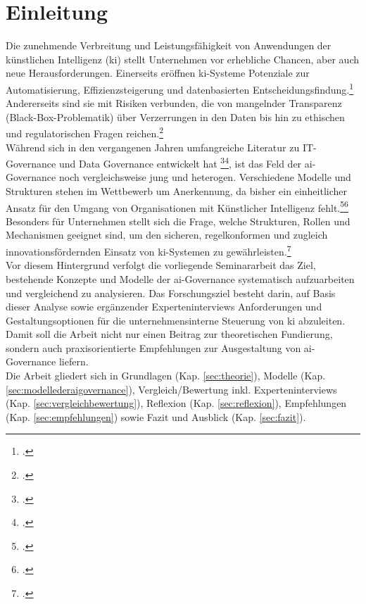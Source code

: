 \section{Einleitung}
\label{sec:einleitung}
Die zunehmende Verbreitung und Leistungsfähigkeit von Anwendungen der künstlichen Intelligenz (\acs{ki}) stellt Unternehmen vor erhebliche Chancen, aber auch neue Herausforderungen.
Einerseits eröffnen \ac{ki}-Systeme Potenziale zur Automatisierung, Effizienzsteigerung und datenbasierten Entscheidungsfindung.\footcite[4,7]{raiNextGenerationDigitalPlatforms2019}
Andererseits sind sie mit Risiken verbunden, die von mangelnder Transparenz (\glqq{}Black-Box\grqq{}-Problematik) über Verzerrungen in den Daten bis hin zu ethischen und regulatorischen Fragen reichen.\footcite[13,14-17]{europeancomissionEthicsGuidelinesTrustworthy}
\\
Während sich in den vergangenen Jahren umfangreiche Literatur zu IT-Governance und Data Governance entwickelt hat \footcite[8-10]{weillITGovernanceHow2004}\footcite[148]{khatriDesigningDataGovernance2010}, ist das Feld der \ac{ai}-Governance noch vergleichsweise jung und heterogen.
Verschiedene Modelle und Strukturen stehen im Wettbewerb um Anerkennung, da bisher ein einheitlicher Ansatz für den Umgang von Organisationen mit Künstlicher Intelligenz fehlt.\footcite[2-3]{batoolResponsibleAIGovernance2023}\footcite[3-4]{mantymakiPDFPuttingAI2025}
Besonders für Unternehmen stellt sich die Frage, welche Strukturen, Rollen und Mechanismen geeignet sind, um den sicheren, regelkonformen und zugleich innovationsfördernden Einsatz von \ac{ki}-Systemen zu gewährleisten.\footcite[2-4]{choungMultilevelFrameworkAI2023}
\\
Vor diesem Hintergrund verfolgt die vorliegende Seminararbeit das Ziel, bestehende Konzepte und Modelle der \ac{ai}-Governance systematisch aufzuarbeiten und vergleichend zu analysieren.
Das Forschungsziel besteht darin, auf Basis dieser Analyse sowie ergänzender Experteninterviews Anforderungen und Gestaltungsoptionen für die unternehmensinterne Steuerung von \ac{ki} abzuleiten.
Damit soll die Arbeit nicht nur einen Beitrag zur theoretischen Fundierung, sondern auch praxisorientierte Empfehlungen zur Ausgestaltung von \ac{ai}-Governance liefern.
\\
Die Arbeit gliedert sich in Grundlagen (Kap. \ref{sec:theorie}), Modelle (Kap. \ref{sec:modellederaigovernance}), Vergleich/Bewertung inkl. Experteninterviews (Kap. \ref{sec:vergleichbewertung}), Reflexion (Kap. \ref{sec:reflexion}), Empfehlungen (Kap. \ref{sec:empfehlungen}) sowie Fazit und Ausblick (Kap. \ref{sec:fazit}).
